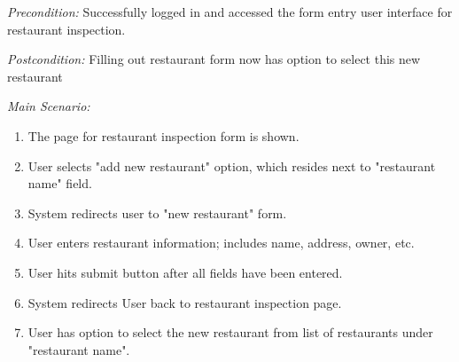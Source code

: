 \documentclass[twoside,letterpaper]{article}
\begin{document}
{\color{black} \textit{Precondition:} Successfully logged in and accessed the form entry user interface for restaurant inspection.}

{\color{black} \textit{Postcondition:}  Filling out restaurant form now has option to select this new restaurant}
\newline

{\color{black} \textit{Main Scenario:}}
\begin{enumerate}
\item The page for restaurant inspection form is shown.

\item User selects "add new restaurant" option, which resides next to "restaurant name" field.

\item System redirects user to "new restaurant" form.

\item User enters restaurant information; includes name, address, owner, etc.

\item User hits submit button after all fields have been entered.

\item System redirects User back to restaurant inspection page.

\item User has option to select the new restaurant from list of restaurants under "restaurant name".

\end{enumerate}
\end{document}

